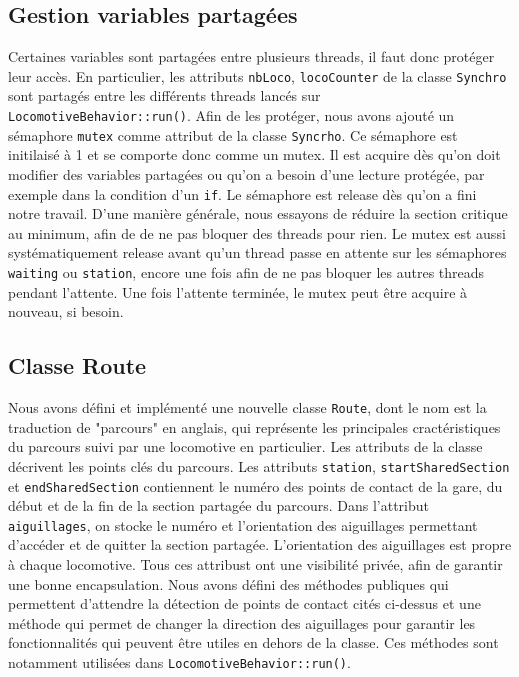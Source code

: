 \documentclass{article}
\begin{document}
\subsection*{Gestion variables partagées}
Certaines variables sont partagées entre plusieurs threads, il faut donc protéger leur accès. En particulier, les attributs
\texttt{nbLoco}, \texttt{locoCounter} de la classe \texttt{Synchro} sont partagés entre les différents threads lancés sur 
\\ \texttt{LocomotiveBehavior::run()}. Afin de les protéger, nous avons ajouté un sémaphore \texttt{mutex} comme attribut de la
classe \texttt{Syncrho}. Ce sémaphore est initilaisé à 1 et se comporte donc comme un mutex. Il est acquire dès qu'on doit 
modifier des variables partagées ou qu'on a besoin d'une lecture protégée, par exemple dans la condition d'un \texttt{if}.
Le sémaphore est release dès qu'on a fini notre travail. D'une manière générale, nous essayons de réduire la section critique
au minimum, afin de de ne pas bloquer des threads pour rien. Le mutex est aussi systématiquement release avant qu'un thread passe 
en attente sur les sémaphores \texttt{waiting} ou \texttt{station}, encore une fois afin de ne pas bloquer les autres threads pendant
l'attente. Une fois l'attente terminée, le mutex peut être acquire à nouveau, si besoin.

\subsection*{Classe Route}
Nous avons défini et implémenté une nouvelle classe \texttt{Route}, dont le nom est la traduction de "parcours" en anglais, qui 
représente les principales cractéristiques du parcours suivi par une locomotive en particulier. Les attributs de la classe 
décrivent les points clés du parcours. Les attributs \texttt{station}, \texttt{startSharedSection} et \texttt{endSharedSection}
contiennent le numéro des points de contact de la gare, du début et de la fin de la section partagée du parcours. Dans l'attribut
\texttt{aiguillages}, on stocke le numéro et l'orientation des aiguillages permettant d'accéder et de quitter la section partagée.
L'orientation des aiguillages est propre à chaque locomotive. Tous ces attribust ont une visibilité privée, afin de garantir une
bonne encapsulation. Nous avons défini des méthodes publiques qui permettent d'attendre la détection de points de contact cités
ci-dessus et une méthode qui permet de changer la direction des aiguillages pour garantir les fonctionnalités qui peuvent être
utiles en dehors de la classe. Ces méthodes sont notamment utilisées dans \texttt{LocomotiveBehavior::run()}.
\end{document}
